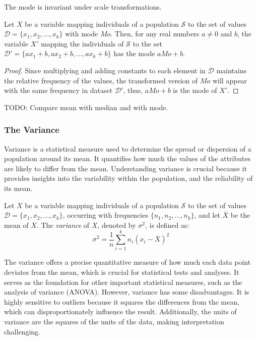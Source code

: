 The mode is invariant under scale transformations.

\begin{proposition}
Let $X$ be a variable mapping individuals of a population $\mathcal{S}$ to the set of values $\mathcal{D} = \{x_1, x_2, \dots, x_k\}$ with mode $Mo$. Then, for any real numbers $a \neq 0$ and $b$, the variable $X'$ mapping the individuals of $\mathcal{S}$ to the set $\mathcal{D}' = \{a x_1 + b, a x_2 + b, \dots, a x_k + b\}$ has the mode $a Mo + b$.
\end{proposition}
\begin{proof}
Since multiplying and adding constants to each element in $\mathcal{D}$ maintains the relative frequency of the values, the transformed version of $Mo$ will appear with the same frequency in dataset $\mathcal{D}'$, thus, $a Mo + b$ is the mode of $X'$.
\end{proof}

{\color{red} TODO: Compare mean with median and with mode.}


\subsubsection*{The Variance}
\label{sec:variance}

Variance is a statistical measure used to determine the spread or dispersion of a population around its mean. It quantifies how much the values of the attributes are likely to differ from the mean. Understanding variance is crucial because it provides insights into the variability within the population, and the reliability of its mean.

\begin{definition}
Let $X$ be a variable mapping individuals of a population $\mathcal{S}$ to the set of values $\mathcal{D} = \{x_1, x_2, \dots, x_k\}$, occurring with frequencies $\{n_1, n_2, \dots, n_k\}$, and let $\overline{X}$ be the mean of $X$. The \emph{variance} of $X$, denoted by \( \sigma^2 \), is defined as:
\[
\sigma^2 = \frac{1}{n} \sum_{i=1}^k n_i (x_i - \overline{X})^2
\]
\end{definition}

The variance offers a precise quantitative measure of how much each data point deviates from the mean, which is crucial for statistical tests and analyses. It serves as the foundation for other important statistical measures, such as the analysis of variance (ANOVA). However, variance has some disadvantages. It is highly sensitive to outliers because it squares the differences from the mean, which can disproportionately influence the result. Additionally, the units of variance are the squares of the units of the data, making interpretation challenging.

